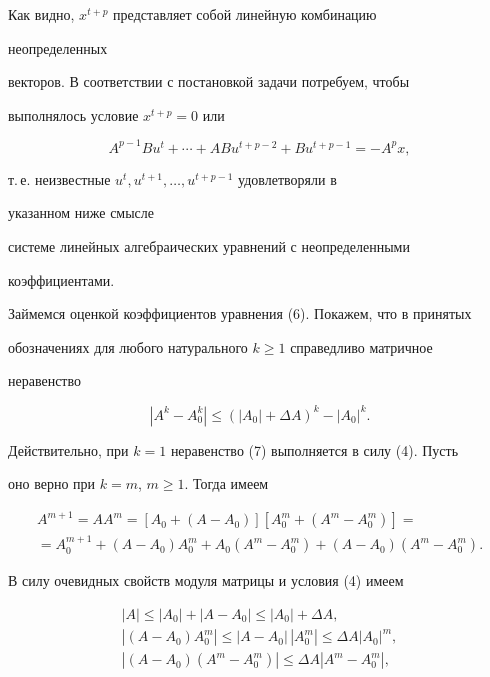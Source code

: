 Как видно, $x^{t+p}$ представляет собой линейную комбинацию 


неопределенных 


векторов. В соответствии с постановкой задачи потребуем, чтобы 


выполнялось условие $x^{t+p}=0$ или 


\begin{equation} 


A^{p-1}Bu^t+\dotsb+ABu^{t+p-2}+Bu^{t+p-1}=-A^p x, 


\end{equation} 


т.\,е. неизвестные $u^t,u^{t+1},\dotsc,u^{t+p-1}$ удовлетворяли в 


указанном ниже смысле 


системе линейных алгебраических уравнений с неопределенными 


коэффициентами. 


 


Займемся оценкой коэффициентов уравнения (6). Покажем, что в принятых 


обозначениях для любого натурального $k\ge 1$ справедливо матричное 


неравенство 


\begin{equation} 


|A^k-A^k_0|\le(|A_0|+\Delta A)^k-|A_0|^k. 


\end{equation} 


Действительно, при $k=1$ неравенство (7) выполняется в силу (4). Пусть 


оно верно при $k=m$, $m\ge 1$. Тогда имеем 


\begin{multline*} 


A^{m+1}=AA^m=[A_0+(A-A_0)][A^m_0+(A^m-A^m_0)]=\\ 


=A^{m+1}_0+(A-A_0)A^m_0+A_0(A^m-A^m_0)+(A-A_0)(A^m-A^m_0). 


\end{multline*} 


В силу очевидных свойств модуля матрицы и условия (4) имеем 


\begin{gather*} 


|A|\le|A_0|+|A-A_0|\le|A_0|+\Delta A,\\ 


|(A-A_0)A^m_0|\le|A-A_0|\,|A^m_0|\le\Delta A|A_0|^m,\\ 


|(A-A_0)(A^m-A^m_0)|\le\Delta A|A^m-A^m_0|, 


\end{gather*} 


